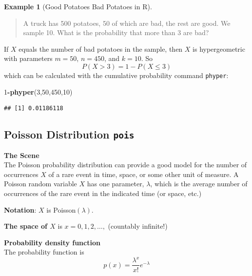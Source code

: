 \documentclass[
]{book}
\newenvironment{Shaded}{\begin{snugshade}}{\end{snugshade}}
\newcommand{\DecValTok}[1]{\textcolor[rgb]{0.00,0.00,0.81}{#1}}
\newcommand{\FunctionTok}[1]{\textcolor[rgb]{0.13,0.29,0.53}{\textbf{#1}}}
\newcommand{\NormalTok}[1]{#1}
\newcommand{\SpecialCharTok}[1]{\textcolor[rgb]{0.81,0.36,0.00}{\textbf{#1}}}
\theoremstyle{definition}
\theoremstyle{definition}
\newtheorem{example}{Example}[chapter]
\theoremstyle{definition}
\theoremstyle{definition}
\theoremstyle{remark}
\begin{document}
\begin{example}[Good Potatoes Bad Potatoes in R]
\protect\hypertarget{exm:potatoes-R}{}\label{exm:potatoes-R}\leavevmode

\begin{quote}
A truck has 500 potatoes, 50 of which are bad, the rest are good. We sample 10. What is the probability that more than 3 are bad?
\end{quote}

If \(X\) equals the number of bad potatoes in the sample, then \(X\) is hypergeometric with parameters \(m = 50\), \(n=450\), and \(k = 10\).
So \[P(X > 3) = 1 - P(X \leq 3)\]
which can be calculated with the cumulative probability command \texttt{phyper}:

\begin{Shaded}
\begin{Highlighting}[]
\DecValTok{1}\SpecialCharTok{{-}}\FunctionTok{phyper}\NormalTok{(}\DecValTok{3}\NormalTok{,}\DecValTok{50}\NormalTok{,}\DecValTok{450}\NormalTok{,}\DecValTok{10}\NormalTok{)}
\end{Highlighting}
\end{Shaded}

\begin{verbatim}
## [1] 0.01186118
\end{verbatim}

\end{example}

\subsection{\texorpdfstring{Poisson Distribution \texttt{pois}}{Poisson Distribution pois}}\label{poisson-distribution-pois}

\textbf{The Scene}\\
The Poisson probability distribution can provide a good model for the number of occurrences \(X\) of a rare event in time, space, or some other unit of measure. A Poisson random variable \(X\) has one parameter, \(\lambda\), which is the average number of occurrences of the rare event in the indicated time (or space, etc.)

\textbf{Notation}: \(X\) is Poisson\((\lambda)\).

\textbf{The space of \(X\)} is \(x = 0,1,2,\ldots,\) (countably infinite!)

\textbf{Probability density function}\\
The probability function is \[p(x)=\frac{\lambda^x}{x!}e^{-\lambda}\]
\end{document}

